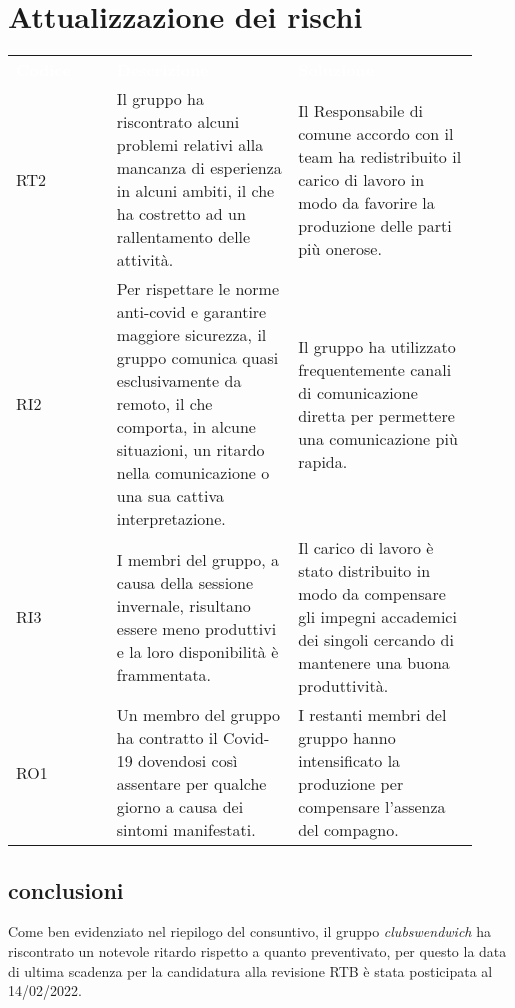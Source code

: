 \section{Attualizzazione dei rischi}
\label{sec:AttualizzazioneRischi}

{\renewcommand{\arraystretch}{1.5} \small
\begin{tabular}{ >{\centering}p{0.20\linewidth} | >{\centering}p{0.36\linewidth} | >{\centering}p{0.36\linewidth}}
	\rowcolor[RGB]{33, 73, 50}
	\textcolor{white}{\textbf{Codice}} & \textcolor{white}
	{\textbf{Descrizione}} & \textcolor{white}{\textbf{Soluzione}}\tabularnewline
	\rowcolor[RGB]{216, 235, 171}
	RT2
    & Il gruppo ha riscontrato alcuni problemi relativi alla mancanza di esperienza in alcuni ambiti, il che ha costretto ad un rallentamento delle attività.  
    & Il Responsabile di comune accordo con il team ha redistribuito il carico di lavoro in modo da favorire la produzione delle parti più onerose. \tabularnewline
    \rowcolor[RGB]{233, 245, 206}
	RI2
    & Per rispettare le norme anti-covid e garantire maggiore sicurezza, il gruppo comunica quasi esclusivamente da remoto, il che comporta, in alcune situazioni, un ritardo nella comunicazione o una sua cattiva interpretazione.
    & Il gruppo ha utilizzato frequentemente canali di comunicazione diretta per permettere una comunicazione più rapida. \tabularnewline
    \rowcolor[RGB]{216, 235, 171}
    RI3
	& I membri del gruppo, a causa della sessione invernale, risultano essere meno produttivi e la loro disponibilità è frammentata. 
    & Il carico di lavoro è stato distribuito in modo da compensare gli impegni accademici dei singoli cercando di mantenere una buona produttività. \tabularnewline
	\rowcolor[RGB]{233, 245, 206}
    RO1
	& Un membro del gruppo ha contratto il Covid-19 dovendosi così assentare per qualche giorno a causa dei sintomi manifestati.
    & I restanti membri del gruppo hanno intensificato la produzione per compensare l'assenza del compagno.   \tabularnewline
\end{tabular}	
}

\subsection{conclusioni}
Come ben evidenziato nel riepilogo del consuntivo, il gruppo \textit{clubswendwich} ha riscontrato un notevole ritardo rispetto a quanto preventivato, per questo la data di ultima scadenza per la candidatura alla revisione RTB è stata posticipata al 14/02/2022.